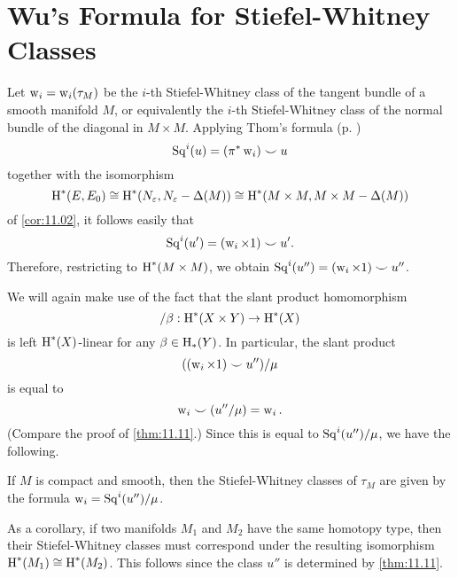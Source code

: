 \documentclass[../main]{subfiles}
\begin{document}
\section{Wu's Formula for Stiefel-Whitney Classes}

Let $\operatorname{w}_i=\operatorname{w}_i(\tau_M)$ be the $i$-th Stiefel-Whitney class of the tangent bundle of a smooth manifold $M$, or equivalently the $i$-th Stiefel-Whitney class of the normal bundle of the diagonal in $M\times M$. Applying Thom's formula (p. \pageref{ch08:thoms identity})
\[
\operatorname{Sq}^i(u)=(\pi^\ast \operatorname{w}_i)\smile u
\]
together with the isomorphism
\[
\operatorname{H}^\ast(E,E_0)
\cong
\operatorname{H}^\ast (N_\varepsilon, N_\varepsilon-\Delta(M))
\cong
\operatorname{H}^\ast (M\times M, M\times M - \Delta(M))
\]
of \ref{cor:11.02}, it follows easily that
\[
\operatorname{Sq}^i(u') = (\operatorname{w}_i \times 1) \smile u'.
\]
Therefore, restricting to $\operatorname{H}^\ast(M\times M)$, we obtain $\operatorname{Sq}^i(u'')=(\operatorname{w}_i\times 1)\smile u''$.

We will again make use of the fact that the slant product homomorphism
\[
/\beta: \operatorname{H}^\ast(X\times Y) \to \operatorname{H}^\ast(X)
\]
is left $\operatorname{H}^\ast(X)$-linear for any $\beta\in \operatorname{H}_\ast(Y)$. In particular, the slant product
\[
((\operatorname{w}_i\times 1)\smile u'')/\mu
\]
is equal to
\[
\operatorname{w}_i \smile (u''/\mu) = \operatorname{w}_i.
\]
(Compare the proof of \ref{thm:11.11}.) Since this is equal to $\operatorname{Sq}^i(u'')/\mu$, we have the following.

\begin{lemma}
\label{lem:11.13}
If $M$ is compact and smooth, then the Stiefel-Whitney classes of $\tau_M$ are given by the formula $\operatorname{w}_i=\operatorname{Sq}^i(u'')/\mu$.
\end{lemma}

As a corollary, if two manifolds $M_1$ and $M_2$ have the same homotopy type, then their Stiefel-Whitney classes must correspond under the resulting isomorphism $\operatorname{H}^\ast(M_1)\cong \operatorname{H}^\ast(M_2)$. This follows since the class $u''$ is determined by \ref{thm:11.11}.
\end{document}
